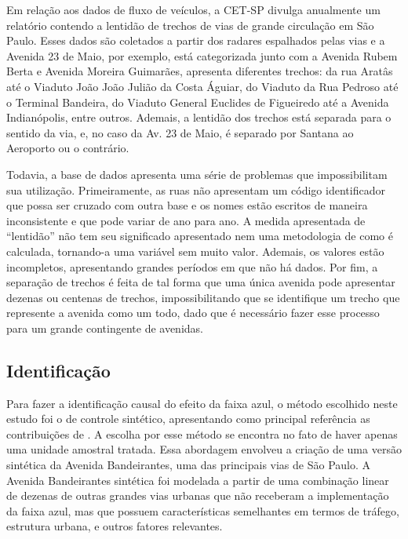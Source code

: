 Em relação aos dados de fluxo de veículos, a CET-SP divulga anualmente um relatório contendo a lentidão de trechos de vias de grande circulação em São Paulo. Esses dados são coletados a partir dos radares espalhados pelas vias e a Avenida 23 de Maio, por exemplo, está categorizada junto com a Avenida Rubem Berta e Avenida Moreira Guimarães, apresenta diferentes trechos: da rua Aratâs até o Viaduto João João Julião da Costa Águiar, do Viaduto da Rua Pedroso até o Terminal Bandeira, do Viaduto General Euclides de Figueiredo até a Avenida Indianópolis, entre outros. Ademais, a lentidão dos trechos está separada para o sentido da via, e, no caso da Av. 23 de Maio, é separado por Santana ao Aeroporto ou o contrário. 

Todavia, a base de dados apresenta uma série de problemas que impossibilitam sua utilização. Primeiramente, as ruas não apresentam um código identificador que possa ser cruzado com outra base e os nomes estão escritos de maneira inconsistente e que pode variar de ano para ano. A medida apresentada de ``lentidão'' não tem seu significado apresentado nem uma metodologia de como é calculada, tornando-a uma variável sem muito valor. Ademais, os valores estão incompletos, apresentando grandes períodos em que não há dados. Por fim, a separação de trechos é feita de tal forma que uma única avenida pode apresentar dezenas ou centenas de trechos, impossibilitando que se identifique um trecho que represente a avenida como um todo, dado que é necessário fazer esse processo para um grande contingente de avenidas.


\subsection{Identificação}

Para fazer a identificação causal do efeito da faixa azul, o método escolhido neste estudo foi o de controle sintético, apresentando como principal referência as contribuições de \textcite{abadie2010synthetic}. A escolha por esse método se encontra no fato de haver apenas uma unidade amostral tratada. Essa abordagem envolveu a criação de uma versão sintética da Avenida Bandeirantes, uma das principais vias de São Paulo. A Avenida Bandeirantes sintética foi modelada a partir de uma combinação linear de dezenas de outras grandes vias urbanas que não receberam a implementação da faixa azul, mas que possuem características semelhantes em termos de tráfego, estrutura urbana, e outros fatores relevantes. 

